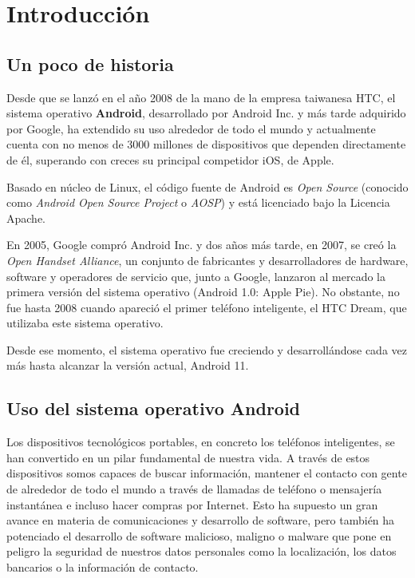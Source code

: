 \chapter{Introducción}

\section{Un poco de historia}

Desde que se lanzó en el año 2008 de la mano de la empresa taiwanesa HTC, el sistema operativo \textbf{Android}, desarrollado por Android Inc. y más tarde adquirido por Google,  ha extendido su uso alrededor de todo el mundo y actualmente cuenta con no menos de 3000 millones de dispositivos que dependen directamente de él, superando con creces su principal competidor iOS, de Apple.

Basado en núcleo de Linux, el código fuente de Android es \textit{Open Source} (conocido como \textit{Android Open Source Project} o \textit{AOSP}) y está licenciado bajo la Licencia Apache.

En 2005, Google compró Android Inc. y dos años más tarde, en 2007, se creó la \textit{Open Handset Alliance}, un conjunto de fabricantes y desarrolladores de hardware, software y operadores de servicio que, junto a Google, lanzaron al mercado la primera versión del sistema operativo (Android 1.0: Apple Pie). No obstante, no fue hasta 2008 cuando apareció el primer teléfono inteligente, el HTC Dream, que utilizaba este sistema operativo.

Desde ese momento, el sistema operativo fue creciendo y desarrollándose cada vez más hasta alcanzar la versión actual, Android 11.

\section{Uso del sistema operativo Android}

Los dispositivos tecnológicos portables, en concreto los teléfonos inteligentes, se han convertido en un pilar fundamental de nuestra vida. A través de estos dispositivos somos capaces de buscar información, mantener el contacto con gente de alrededor de todo el mundo a través de llamadas de teléfono o mensajería instantánea e incluso hacer compras por Internet. Esto ha supuesto un gran avance en materia de comunicaciones y desarrollo de software, pero también ha potenciado el desarrollo de software malicioso, maligno o malware que pone en peligro la seguridad de nuestros datos personales como la localización, los datos bancarios o la información de contacto. 

